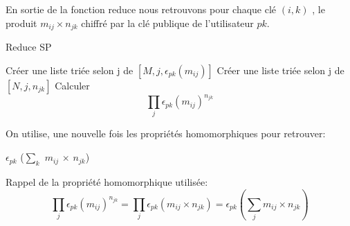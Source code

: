 En sortie de la fonction reduce nous retrouvons pour chaque clé $(i,k)$ , le produit  $m_{ij} \times n_{jk}$ chiffré par la clé publique de l'utilisateur $pk$.
\littlesectionspace 
\begin{algorithm}[H]
  \caption{Reduce SP}
  \label{algo_reduce_OneStep_SP}
  \begin{algorithmic}
    \State Cr\'{e}er une liste triée selon j de $[M,j,\epsilon_{pk}(m_{ij})]$
    \State Cr\'{e}er une liste triée selon j de $[N,j,n_{jk}]$
    \State Calculer
    \[
		\prod_{j} \epsilon_{pk}( m_{ij})^{n_{jk}}  
	\]
	\EndFor
  \end{algorithmic}
\end{algorithm}

\noindent On utilise, une nouvelle fois les propriétés homomorphiques pour retrouver:\par
\begin{center}
$\epsilon_{pk}$ ($\sum_{k}$ $m_{ij}$ $\times$ $n_{jk}$)
\end{center}

Rappel de la propriété homomorphique utilisée:
\[
	\prod_{j} \epsilon_{pk}( m_{ij})^{n_{jk}}  = 
	\prod_{j} \epsilon_{pk}( m_{ij} \times n_{jk} ) =
	 \epsilon_{pk}( \sum _{j}  m_{ij} \times n_{jk}  )
\]
